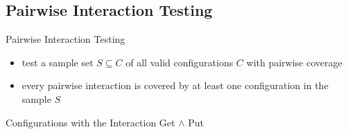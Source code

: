 \subsection{Pairwise Interaction Testing}
\begin{frame}{\insertsubsection}
	\begin{fancycolumns}
		\begin{definition}{Pairwise Interaction Testing}
			\begin{itemize}
				\item test a sample set $S \subseteq C$ of all valid configurations $C$ with pairwise coverage
				\item every pairwise interaction is covered by at least one configuration in the sample $S$
			\end{itemize}
		\end{definition}
		\begin{example}{Configurations with the Interaction Get $\wedge$ Put}
			\footnotesize
\end{example}
\end{fancycolumns}
\end{frame}
